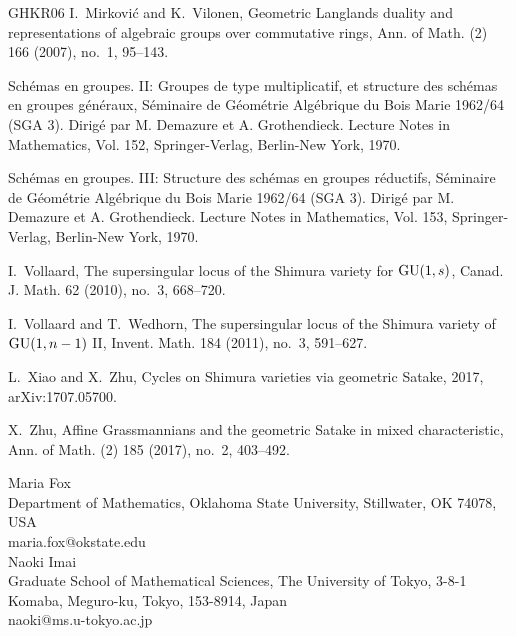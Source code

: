 \documentclass[12pt,a4paper]{article}
\begin{document}
\begin{thebibliography}{GHKR06}
	I.~Mirkovi\'{c} and K.~Vilonen, Geometric {L}anglands duality and
	representations of algebraic groups over commutative rings, Ann. of Math. (2)
	166 (2007), no.~1, 95--143.
	
	Sch\'{e}mas en groupes. {II}: {G}roupes de type multiplicatif, et structure des
	sch\'{e}mas en groupes g\'{e}n\'{e}raux, S\'{e}minaire de G\'{e}om\'{e}trie
	Alg\'{e}brique du Bois Marie 1962/64 (SGA 3). Dirig\'{e} par M. Demazure et
	A. Grothendieck. Lecture Notes in Mathematics, Vol. 152, Springer-Verlag,
	Berlin-New York, 1970.
	
	Sch\'emas en groupes. {III}: {S}tructure des sch\'emas en groupes r\'eductifs,
	S\'eminaire de G\'eom\'etrie Alg\'ebrique du Bois Marie 1962/64 (SGA 3).
	Dirig\'e par M. Demazure et A. Grothendieck. Lecture Notes in Mathematics,
	Vol. 153, Springer-Verlag, Berlin-New York, 1970.
	
	I.~Vollaard, The supersingular locus of the {S}himura variety for {${\rm
			GU}(1,s)$}, Canad. J. Math. 62 (2010), no.~3, 668--720.
	
	I.~Vollaard and T.~Wedhorn, The supersingular locus of the {S}himura variety of
	{${\rm GU}(1,n-1)$} {II}, Invent. Math. 184 (2011), no.~3, 591--627.
	
	L.~Xiao and X.~Zhu, Cycles on Shimura varieties via geometric Satake, 2017,
	arXiv:1707.05700.
	
	X.~Zhu, Affine {G}rassmannians and the geometric {S}atake in mixed
	characteristic, Ann. of Math. (2) 185 (2017), no.~2, 403--492.
	
\end{thebibliography}


\noindent
Maria Fox\\
Department of Mathematics, 
Oklahoma State University, 
Stillwater, OK 74078, USA\\
maria.fox@okstate.edu\\

\noindent
Naoki Imai\\
Graduate School of Mathematical Sciences, The University of Tokyo, 
3-8-1 Komaba, Meguro-ku, Tokyo, 153-8914, Japan \\
naoki@ms.u-tokyo.ac.jp 
\end{document}
